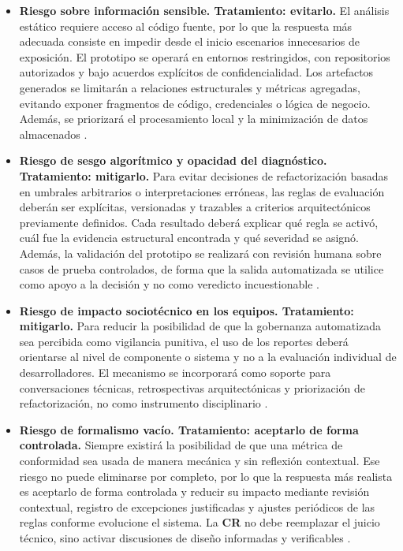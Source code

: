 \begin{itemize}
    \item \textbf{Riesgo sobre información sensible. Tratamiento: evitarlo.} El análisis estático requiere acceso al código fuente, por lo que la respuesta más adecuada consiste en impedir desde el inicio escenarios innecesarios de exposición. El prototipo se operará en entornos restringidos, con repositorios autorizados y bajo acuerdos explícitos de confidencialidad. Los artefactos generados se limitarán a relaciones estructurales y métricas agregadas, evitando exponer fragmentos de código, credenciales o lógica de negocio. Además, se priorizará el procesamiento local y la minimización de datos almacenados \parencite{Hamed2023, LAIG2025}.

    \item \textbf{Riesgo de sesgo algorítmico y opacidad del diagnóstico. Tratamiento: mitigarlo.} Para evitar decisiones de refactorización basadas en umbrales arbitrarios o interpretaciones erróneas, las reglas de evaluación deberán ser explícitas, versionadas y trazables a criterios arquitectónicos previamente definidos. Cada resultado deberá explicar qué regla se activó, cuál fue la evidencia estructural encontrada y qué severidad se asignó. Además, la validación del prototipo se realizará con revisión humana sobre casos de prueba controlados, de forma que la salida automatizada se utilice como apoyo a la decisión y no como veredicto incuestionable \parencite{SasAvgeriou, Klein2022}.

    \item \textbf{Riesgo de impacto sociotécnico en los equipos. Tratamiento: mitigarlo.} Para reducir la posibilidad de que la gobernanza automatizada sea percibida como vigilancia punitiva, el uso de los reportes deberá orientarse al nivel de componente o sistema y no a la evaluación individual de desarrolladores. El mecanismo se incorporará como soporte para conversaciones técnicas, retrospectivas arquitectónicas y priorización de refactorización, no como instrumento disciplinario \parencite{Hamed2023, PaulWang2019}.

    \item \textbf{Riesgo de formalismo vacío. Tratamiento: aceptarlo de forma controlada.} Siempre existirá la posibilidad de que una métrica de conformidad sea usada de manera mecánica y sin reflexión contextual. Ese riesgo no puede eliminarse por completo, por lo que la respuesta más realista es aceptarlo de forma controlada y reducir su impacto mediante revisión contextual, registro de excepciones justificadas y ajustes periódicos de las reglas conforme evolucione el sistema. La \textbf{CR} no debe reemplazar el juicio técnico, sino activar discusiones de diseño informadas y verificables \parencite{LAIG2025}.


\end{itemize}
